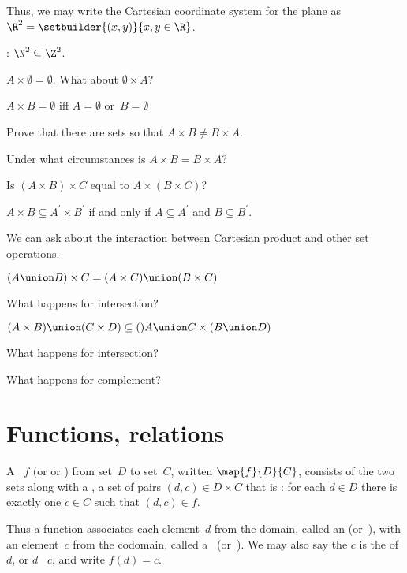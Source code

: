\documentclass{ibl}
\begin{document}
Thus, we may write 
the Cartesian coordinate system for the plane as
$\R^2=\setbuilder{(x,y)}{x,y\in\R}$.

\begin{ex}
\pord:  $\N^2\subseteq \Z^2$.  
\end{ex}

\begin{ex}
\begin{exes}
\item $A\times \emptyset=\emptyset$.
  What about $\emptyset\times A$?
\item $A\times B=\emptyset$ iff $A=\emptyset$ or~$B=\emptyset$
\item Prove that there are sets so that $A\times B\neq B\times A$.
\item Under what circumstances is $A\times B=B\times A$?
\item Is $(A\times B)\times C$ equal to $A\times (B\times C)$?
\item $A\times B\subseteq A^\prime\times B^\prime$ if and only if
  $A\subseteq A^\prime$ and $B\subseteq B^\prime$.
\end{exes}
\end{ex}

\begin{ex} We can ask about the interaction between Cartesian product and 
other set operations.
\begin{exes}
\item $(A\union B)\times C=(A\times C)\union(B\times C)$
\item What happens for intersection?
\item $(A\times B)\union (C\times D)\subseteq ()A\union C\times (B\union D)$
\item What happens for intersection?
\item What happens for complement?
\end{exes}
\end{ex}








\chapter{Functions, relations}
\begin{df}
A ~$f$ (or  or ) 
from  set~$D$
to  set~$C$, written $\map{f}{D}{C}$,
consists of the two sets along with a , 
a set of pairs $(d,c)\in D\times C$ that is 
: for each $d\in D$ there is
exactly one $c\in C$ such that $(d,c)\in f$. 

Thus a function associates each element~$d$ from the domain,
called an  (or~),
with an element~$c$ from the codomain, 
called a~ (or~). 
We may also say the $c$ is the  of $d$, 
or $d$ ~$c$, and write $f(d)=c$.
\end{df}
\end{document}
